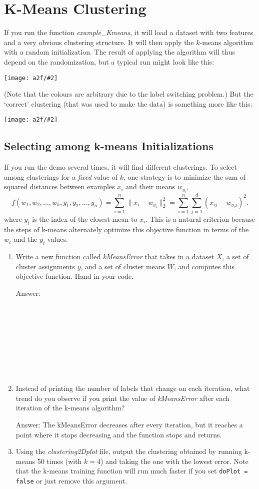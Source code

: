 \documentclass{article}
\def\ans#1{\par\gre{Answer: #1}}
\def\blu#1{{\color{blu}#1}}
\def\gre#1{{\color{gre}#1}}
\def\norm#1{\|#1\|}
\newcommand{\centerfig}[2]{\begin{center}\texttt{[image: a2f/\#2]}\end{center}}
\def\enum#1{\begin{enumerate}#1\end{enumerate}}
\begin{document}
\newpage

\section{K-Means Clustering}

If you run the function \emph{example\_Kmeans}, it will load a dataset with two features and a very obvious clustering structure. It will then apply the $k$-means algorithm with a random initialization. The result of applying the algorithm will thus depend on the randomization, but a typical run might look like this:
\centerfig{.5}{kMeans}
(Note that the colours are arbitrary due to the label switching problem.)
But the `correct' clustering (that was used to make the data) is something more like this:
\centerfig{.5}{kMeans2}

\subsection{Selecting among k-means Initializations}

If you run the demo several times, it will find different clusterings. To select among clusterings for a \emph{fixed} value of $k$, one strategy is to minimize the sum of squared distances between examples $x_i$ and their means $w_{y_i}$,
\[
f(w_1,w_2,\dots,w_k,y_1,y_2,\dots,y_n) = \sum_{i=1}^n \norm{x_i - w_{y_i}}_2^2 = \sum_{i=1}^n \sum_{j=1}^d (x_{ij} - w_{y_ij})^2.
\]
 where $y_i$ is the index of the closest mean to $x_i$. This is a natural criterion because the steps of k-means alternately optimize this objective function in terms of the $w_c$ and the $y_i$ values.

\pagebreak


 \blu{\enum{
 \item Write a new function called \emph{kMeansError} that takes in a dataset $X$, a set of cluster assignments $y$, and a set of cluster means $W$, and computes this objective function. Hand in your code.
\ans{
\\
\\
\\
\\
\\
\\
\\
\\
\\}
 \item Instead of printing the number of labels that change on each iteration, what trend do you observe if you print the value of \emph{kMeansError} after each iteration of the k-means algorithm?
\ans{The kMeansError decreases after every iteration, but it reaches a point where it stops decreasing and the function stops and returns.}
 \item Using the \emph{clustering2Dplot} file, output the clustering obtained by running k-means 50 times (with $k=4$) and taking the one with the lowest error. Note that the k-means training function will run much faster if you set \texttt{doPlot = false} or just remove this argument.
 }}
\end{document}
